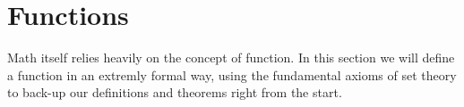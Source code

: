 \section{Functions}
Math itself relies heavily on the concept of function. In this section we will 
define a function in an extremly formal way, using the fundamental axioms of set theory 
to back-up our definitions and theorems right from the start. \\



\newpage